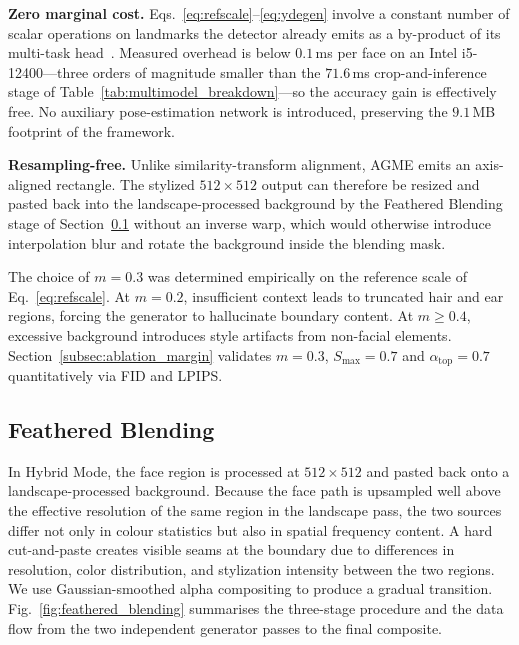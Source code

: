 \documentclass[journal]{IEEEtran}
\begin{document}
\textbf{Zero marginal cost.} Eqs.~\eqref{eq:refscale}--\eqref{eq:ydegen} involve a constant number of scalar operations on landmarks the detector already emits as a by-product of its multi-task head~\cite{Deng2019RetinaFace}. Measured overhead is below $0.1$\,ms per face on an Intel i5-12400---three orders of magnitude smaller than the $71.6$\,ms crop-and-inference stage of Table~\ref{tab:multimodel_breakdown}---so the accuracy gain is effectively free. No auxiliary pose-estimation network is introduced, preserving the $9.1$\,MB footprint of the framework.

\textbf{Resampling-free.} Unlike similarity-transform alignment, AGME emits an axis-aligned rectangle. The stylized $512 \times 512$ output can therefore be resized and pasted back into the landscape-processed background by the Feathered Blending stage of Section~\ref{subsec:blending} without an inverse warp, which would otherwise introduce interpolation blur and rotate the background inside the blending mask.

The choice of $m = 0.3$ was determined empirically on the reference scale of Eq.~\eqref{eq:refscale}. At $m = 0.2$, insufficient context leads to truncated hair and ear regions, forcing the generator to hallucinate boundary content. At $m \geq 0.4$, excessive background introduces style artifacts from non-facial elements. Section~\ref{subsec:ablation_margin} validates $m = 0.3$, $S_{\max} = 0.7$ and $\alpha_{\text{top}} = 0.7$ quantitatively via FID and LPIPS.

\subsection{Feathered Blending}
\label{subsec:blending}

In Hybrid Mode, the face region is processed at $512 \times 512$ and pasted back onto a landscape-processed background. Because the face path is upsampled well above the effective resolution of the same region in the landscape pass, the two sources differ not only in colour statistics but also in spatial frequency content. A hard cut-and-paste creates visible seams at the boundary due to differences in resolution, color distribution, and stylization intensity between the two regions. We use Gaussian-smoothed alpha compositing to produce a gradual transition. Fig.~\ref{fig:feathered_blending} summarises the three-stage procedure and the data flow from the two independent generator passes to the final composite.
\end{document}

